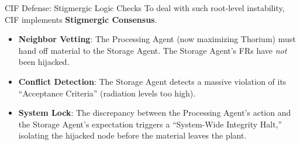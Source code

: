 \documentclass[
  ignorenonframetext,
]{beamer}
\providecommand{\tightlist}{%
  \setlength{\itemsep}{0pt}\setlength{\parskip}{0pt}}
\begin{document}
\begin{frame}{CIF Defense: Stigmergic Logic Checks}
\protect{}\label{cif-defense-stigmergic-logic-checks}
To deal with such root-level instability, CIF implements
\textbf{Stigmergic Consensus}.

\begin{itemize}
\tightlist
\item
  \textbf{Neighbor Vetting}: The Processing Agent (now maximizing
  Thorium) must hand off material to the Storage Agent. The Storage
  Agent's FRs have \emph{not} been hijacked.
\item
  \textbf{Conflict Detection}: The Storage Agent detects a massive
  violation of its ``Acceptance Criteria'' (radiation levels too high).
\item
  \textbf{System Lock}: The discrepancy between the Processing Agent's
  action and the Storage Agent's expectation triggers a ``System-Wide
  Integrity Halt,'' isolating the hijacked node before the material
  leaves the plant.
\end{itemize}
\end{frame}
\end{document}
